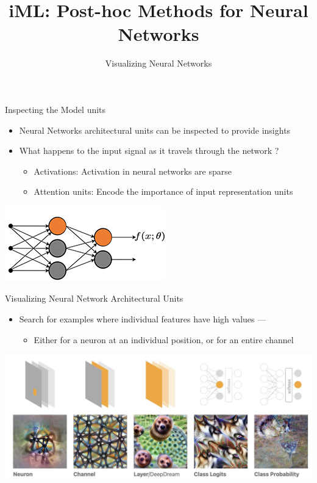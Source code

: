 \documentclass[aspectratio=169]{../latex_main/tntbeamer}
\title{iML: Post-hoc Methods for Neural Networks}
\subtitle{Visualizing Neural Networks}
\begin{document}
	\maketitle
	\graphicspath{ {./figure/} }
	
\begin{frame}[c]{Inspecting the Model units}
    \begin{itemize}
        \item Neural Networks architectural units can be inspected to provide insights
        \item What happens to the input signal as it travels through the network ?
        \begin{itemize}
            \item Activations: Activation in neural networks are sparse
            \item Attention units: Encode the importance of input representation units
        \end{itemize}
    \end{itemize}
    
    \centering
    \includegraphics[scale=1]{fertig}
\end{frame}

\begin{frame}{Visualizing Neural Network Architectural Units}
    \begin{itemize}
        \item Search for examples where individual features have high values —
        \begin{itemize}
            \item Either for a neuron at an individual position, or for an entire channel
        \end{itemize}
    \end{itemize}
    
    \includegraphics[scale=.47]{img180}
\end{frame}
    
\end{document}
